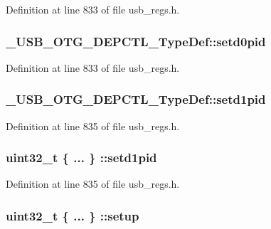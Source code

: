 Definition at line 833 of file usb\-\_\-regs.\-h.

\hypertarget{group___u_s_b___o_t_g___d_r_i_v_e_r_ga5352bfdd79679f5fba2e20e336c0d48f}{
\subsubsection[{setd0pid}]{ \-\_\-\-U\-S\-B\-\_\-\-O\-T\-G\-\_\-\-D\-E\-P\-C\-T\-L\-\_\-\-Type\-Def\-::setd0pid}}\label{group___u_s_b___o_t_g___d_r_i_v_e_r_ga5352bfdd79679f5fba2e20e336c0d48f}


Definition at line 833 of file usb\-\_\-regs.\-h.

\hypertarget{group___u_s_b___o_t_g___d_r_i_v_e_r_gad8a3a72618af4a2c5134a74458fae380}{
\subsubsection[{setd1pid}]{ \-\_\-\-U\-S\-B\-\_\-\-O\-T\-G\-\_\-\-D\-E\-P\-C\-T\-L\-\_\-\-Type\-Def\-::setd1pid}}\label{group___u_s_b___o_t_g___d_r_i_v_e_r_gad8a3a72618af4a2c5134a74458fae380}


Definition at line 835 of file usb\-\_\-regs.\-h.

\hypertarget{group___u_s_b___o_t_g___d_r_i_v_e_r_gac1a12246537f6804be8d6e19f28ed7aa}{
\subsubsection[{setd1pid}]{\setlength{\rightskip}{0pt plus 5cm}uint32\-\_\-t \{ ... \} \-::setd1pid}}\label{group___u_s_b___o_t_g___d_r_i_v_e_r_gac1a12246537f6804be8d6e19f28ed7aa}


Definition at line 835 of file usb\-\_\-regs.\-h.

\hypertarget{group___u_s_b___o_t_g___d_r_i_v_e_r_ga2afd5b8b8d8e64db2970e253a32238f8}{
\subsubsection[{setup}]{\setlength{\rightskip}{0pt plus 5cm}uint32\-\_\-t \{ ... \} \-::setup}}\label{group___u_s_b___o_t_g___d_r_i_v_e_r_ga2afd5b8b8d8e64db2970e253a32238f8}


